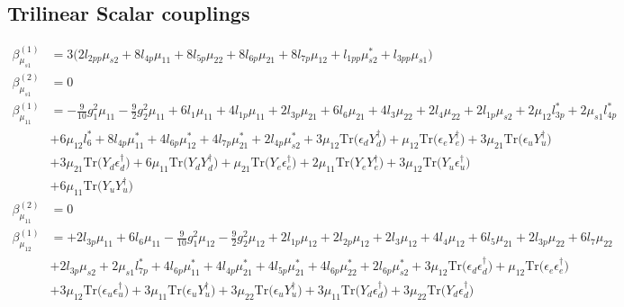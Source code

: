 \subsection{Trilinear Scalar couplings}
{\allowdisplaybreaks  \begin{align} 
\beta_{\mu_{s1}}^{(1)} & =  
3 \Big(2 l_{2pp} \mu_{s2}  + 8 l_{4p} \mu_{11}  + 8 l_{5p} \mu_{22}  + 8 l_{6p} \mu_{21}  + 8 l_{7p} \mu_{12}  + l_{1pp} \mu_{s2}^*  + l_{3pp} \mu_{s1} \Big)\\ 
\beta_{\mu_{s1}}^{(2)} & =  
0\\ 
\beta_{\mu_{11}}^{(1)} & =  
-\frac{9}{10} g_{1}^{2} \mu_{11} -\frac{9}{2} g_{2}^{2} \mu_{11} +6 l_1 \mu_{11} +4 l_{1p} \mu_{11} +2 l_{3p} \mu_{21} +6 l_6 \mu_{21} +4 l_3 \mu_{22} +2 l_4 \mu_{22} +2 l_{1p} \mu_{s2} +2 \mu_{12} l_{3p}^* +2 \mu_{s1} l_{4p}^* \nonumber \\ 
 &+6 \mu_{12} l_6^* +8 l_{4p} \mu_{11}^* +4 l_{6p} \mu_{12}^* +4 l_{7p} \mu_{21}^* +2 l_{4p} \mu_{s2}^* +3 \mu_{12} \mbox{Tr}\Big({\epsilon_d  Y_{d}^{\dagger}}\Big) +\mu_{12} \mbox{Tr}\Big({\epsilon_e  Y_{e}^{\dagger}}\Big) +3 \mu_{21} \mbox{Tr}\Big({\epsilon_u  Y_{u}^{\dagger}}\Big) \nonumber \\ 
 &+3 \mu_{21} \mbox{Tr}\Big({Y_d  \epsilon_{d}^{\dagger}}\Big) +6 \mu_{11} \mbox{Tr}\Big({Y_d  Y_{d}^{\dagger}}\Big) +\mu_{21} \mbox{Tr}\Big({Y_e  \epsilon_{e}^{\dagger}}\Big) +2 \mu_{11} \mbox{Tr}\Big({Y_e  Y_{e}^{\dagger}}\Big) +3 \mu_{12} \mbox{Tr}\Big({Y_u  \epsilon_{u}^{\dagger}}\Big) \nonumber \\ 
 &+6 \mu_{11} \mbox{Tr}\Big({Y_u  Y_{u}^{\dagger}}\Big) \\ 
\beta_{\mu_{11}}^{(2)} & =  
0\\ 
\beta_{\mu_{12}}^{(1)} & =  
+2 l_{3p} \mu_{11} +6 l_6 \mu_{11} -\frac{9}{10} g_{1}^{2} \mu_{12} -\frac{9}{2} g_{2}^{2} \mu_{12} +2 l_{1p} \mu_{12} +2 l_{2p} \mu_{12} +2 l_3 \mu_{12} +4 l_4 \mu_{12} +6 l_5 \mu_{21} +2 l_{3p} \mu_{22} +6 l_7 \mu_{22} \nonumber \\ 
 &+2 l_{3p} \mu_{s2} +2 \mu_{s1} l_{7p}^* +4 l_{6p} \mu_{11}^* +4 l_{4p} \mu_{21}^* +4 l_{5p} \mu_{21}^* +4 l_{6p} \mu_{22}^* +2 l_{6p} \mu_{s2}^* +3 \mu_{12} \mbox{Tr}\Big({\epsilon_d  \epsilon_{d}^{\dagger}}\Big) +\mu_{12} \mbox{Tr}\Big({\epsilon_e  \epsilon_{e}^{\dagger}}\Big) \nonumber \\ 
 &+3 \mu_{12} \mbox{Tr}\Big({\epsilon_u  \epsilon_{u}^{\dagger}}\Big) +3 \mu_{11} \mbox{Tr}\Big({\epsilon_u  Y_{u}^{\dagger}}\Big) +3 \mu_{22} \mbox{Tr}\Big({\epsilon_u  Y_{u}^{\dagger}}\Big) +3 \mu_{11} \mbox{Tr}\Big({Y_d  \epsilon_{d}^{\dagger}}\Big) +3 \mu_{22} \mbox{Tr}\Big({Y_d  \epsilon_{d}^{\dagger}}\Big) \nonumber \\ 

\end{align}}
